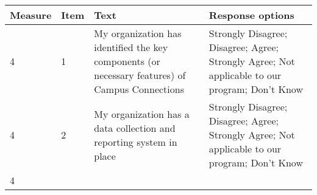 \documentclass[]{article}
\begin{document}
\begin{longtable}[]{@{}llll@{}}
\toprule
\begin{minipage}[b]{0.05\columnwidth}\raggedright\strut
Measure\strut
\end{minipage} & \begin{minipage}[b]{0.04\columnwidth}\raggedright\strut
Item\strut
\end{minipage} & \begin{minipage}[b]{0.41\columnwidth}\raggedright\strut
Text\strut
\end{minipage} & \begin{minipage}[b]{0.39\columnwidth}\raggedright\strut
Response options\strut
\end{minipage}\tabularnewline
\midrule
\endhead
\begin{minipage}[t]{0.05\columnwidth}\raggedright\strut
4\strut
\end{minipage} & \begin{minipage}[t]{0.04\columnwidth}\raggedright\strut
1\strut
\end{minipage} & \begin{minipage}[t]{0.41\columnwidth}\raggedright\strut
My organization has identified the key components (or necessary
features) of Campus Connections\strut
\end{minipage} & \begin{minipage}[t]{0.39\columnwidth}\raggedright\strut
Strongly Disagree; Disagree; Agree; Strongly Agree; Not applicable to
our program; Don't Know\strut
\end{minipage}\tabularnewline
\begin{minipage}[t]{0.05\columnwidth}\raggedright\strut
4\strut
\end{minipage} & \begin{minipage}[t]{0.04\columnwidth}\raggedright\strut
2\strut
\end{minipage} & \begin{minipage}[t]{0.41\columnwidth}\raggedright\strut
My organization has a data collection and reporting system in
place\strut
\end{minipage} & \begin{minipage}[t]{0.39\columnwidth}\raggedright\strut
Strongly Disagree; Disagree; Agree; Strongly Agree; Not applicable to
our program; Don't Know\strut
\end{minipage}\tabularnewline
\begin{minipage}[t]{0.05\columnwidth}\raggedright\strut
4\strut
\end{minipage} & \begin{minipage}[t]{0.04\columnwidth}\raggedright\strut

\end{minipage}
\end{longtable}
\end{document}
